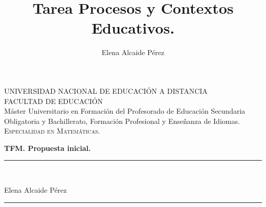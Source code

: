 \documentclass[a4paper, openright, 11pt, titlepage]{report}
\title{Tarea Procesos y Contextos Educativos.}
\author{Elena Alcaide Pérez}
\theoremstyle{definition}\newtheorem{defin}[propo]{Definition}
\theoremstyle{definition}\newtheorem{obser}[propo]{Remark}
\theoremstyle{definition}\newtheorem{ejem}[propo]{Ejemplo}
\theoremstyle{definition}\newtheorem{algoritmo}[propo]{Algoritmo}
\begin{document}
\sloppy

\begin{titlepage}

\begin{center}




UNIVERSIDAD NACIONAL DE EDUCACIÓN A DISTANCIA\\
\vspace*{0.15in}
FACULTAD DE EDUCACIÓN\\
\vspace*{0.2in}
Máster Universitario en Formación del Profesorado 
de Educación Secundaria Obligatoria y Bachillerato, Formación Profesional y Enseñanza de Idiomas.\\
\textsc{Especialidad en Matemáticas.}\\
\vspace*{0.6in}
\vspace*{0.2in}
\begin{LARGE}
\textbf{TFM. Propuesta inicial.} \\
\end{LARGE}
\vspace*{0.3in}

\vspace*{0.3in}
\rule{80mm}{0.1mm}\\
\vspace*{0.1in}

\begin{LARGE}
Elena Alcaide Pérez\\
\end{LARGE}
\vspace*{0.2in}
\rule{80mm}{0.1mm}\\
\vspace*{0.1in}
\end{center}
\end{titlepage}
\newpage
{}
$\ $
\thispagestyle{empty} %
\end{document}
